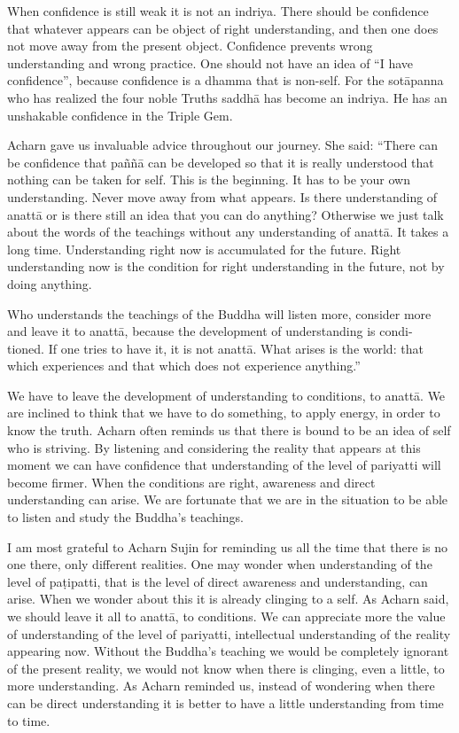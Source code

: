 {{{{{{{{{{{When confidence is still weak it is not
an indriya. There should be confidence that whatever appears can be
object of right understanding, and then one does not move away from the
present object. Confidence prevents wrong understanding and wrong
practice. One should not have an idea of ``I have confidence'', because
confidence is a dhamma that is non-self. For the sotāpanna who has
realized the four noble Truths saddhā has become an indriya. He has an
unshakable confidence in the Triple Gem. 

Acharn gave us invaluable advice
throughout our journey. She said: ``There can be confidence that paññā
can be developed so that it is really understood that nothing can be
taken for self. This is the beginning. It has to be your own
understanding. Never move away from what appears. Is there understanding
of anattā or is there still an idea that you can do anything? Otherwise
we just talk about the words of the teachings without any understanding
of anattā. It takes a long time. Understanding right now is accumulated
for the future. Right understanding now is the condition for right
understanding in the future, not by doing anything. 

Who understands the teachings of the
Buddha will listen more, consider more and leave it to anattā, because
the development of understanding is condi- tioned. If one tries to have
it, it is not anattā. What arises is the world: that which experiences
and that which does not experience anything.'' 

We have to leave the development of
understanding to conditions, to anattā. We are inclined to think that we
have to do something, to apply energy, in order to know the truth.
Acharn often reminds us that there is bound to be an idea of self who is
striving. By listening and considering the reality that appears at this
moment we can have confidence that understanding of the level of
pariyatti will become firmer. When the conditions are right, awareness
and direct understanding can arise. We are fortunate that we are in the
situation to be able to listen and study the Buddha's teachings. 

I am most grateful to Acharn Sujin for
reminding us all the time that there is no one there, only different
realities. One may wonder when understanding of the level of paṭipatti,
that is the level of direct awareness and understanding, can arise. When
we wonder about this it is already clinging to a self. As Acharn said,
we should leave it all to anattā, to conditions. We can appreciate more
the value of understanding of the level of pariyatti, intellectual
understanding of the reality appearing now. Without the Buddha's
teaching we would be completely ignorant of the present reality, we
would not know when there is clinging, even a little, to more
understanding. As Acharn reminded us, instead of wondering when there
can be direct understanding it is better to have a little understanding
from time to time.

}}}}}}}}}}}
